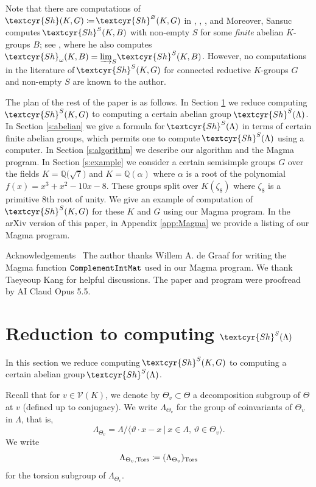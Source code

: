 \documentclass[11pt]{amsart}
\renewcommand{\mathbb}{\mathds}
\newcommand{\Sha}{{\!\textcyr{Sh}}}
\theoremstyle{plain}
\theoremstyle{definition}
\newcommand{\Q}{{\mathbb Q}}
\newcommand{\hs}{\kern 0.8pt}
\newcommand{\V}{{\mathcal V}}
\newcommand{\Tors}{{\rm Tors}}
\newcommand{\Thv}{{\Theta_v}}
\begin{document}
Note that there are computations of  $\Sha(K,G)\coloneqq\Sha^\varnothing(K,G)$
in \cite[Examples 5.6, 5.7, 5.8]{Sansuc},
\cite[\,(4.2.2)\hs]{Kottwitz-84}, \cite[Corollary 5.13]{Borovoi-Memoir},
and \cite[Theorem 9.4]{CT}
Moreover, Sansuc \cite[p.~15]{Sansuc} computes $\Sha^S(K,B)$ with non-empty $S$
for some {\em finite} abelian $K$-groups $B$;
see \cite[\S 2]{Sansuc}, where he also computes $\Sha_\omega(K,B)=\varinjlim_S \Sha^S(K,B)$.
However, no computations in the literature
of $\Sha^S(K,G)$ for connected reductive $K$-groups $G$ and non-empty $S$ are known to the author.

The plan of the rest of the paper is as follows.
In Section \ref{s:reduction} we reduce computing $\Sha^S(K,G)$
to computing a certain abelian group $\Sha^S(\Lambda)$.
In Section \ref{s:abelian} we give a formula for $\Sha^S(\Lambda)$
in terms of certain  finite abelian groups,
which permits one to compute $\Sha^S(\Lambda)$ using a computer.
In Section \ref{s:algorithm} we describe our algorithm and the Magma program.
In Section \ref{s:example} we consider a certain semisimple groups $G$
over the fields $K=\Q\big(\sqrt7\big)$ and $K=\Q(\alpha)$ where $\alpha$
is a root of the polynomial $f(x)=x^3+x^2-10x-8$.
These groups split over $K(\zeta_8)$ where $\zeta_8$ is a primitive 8th root of unity.
We give  an example of computation
of $\Sha^S(K,G)$ for these $K$ and $G$ using our Magma program.
In the arXiv version of this paper, in Appendix \ref{app:Magma}
we provide a listing of our Magma program.

{\sc Acknowledgements\ } The author thanks Willem A. de Graaf for writing the Magma function
$\tt ComplementIntMat$ used in our Magma program. We thank Taeyeoup Kang for helpful discussions.
The paper and program were proofread by AI Claud Opus 5.5.









\section{Reduction to computing $\Sha^S(\Lambda)$}
\label{s:reduction}

In this section we reduce computing $\Sha^S(K,G)$
to computing a certain abelian group $\Sha^S(\Lambda)$.

Recall that for $v\in \V(K)$, we denote by
$\Thv\subset \Theta$  a decomposition subgroup of $\Theta$ at $v$
(defined up to conjugacy).
We write $\Lambda_\Thv$ for the group of coinvariants of $\Thv$ in $\Lambda$, that is,
\[\Lambda_\Thv=\Lambda/\langle \vartheta\cdot x-x\ | \ x\in \Lambda,\, \vartheta\in\Thv\rangle.\]
We write
\[\Lambda_{\Thv,\Tors}\coloneqq (\Lambda_\Thv)_\Tors\]
for the torsion subgroup of $\Lambda_\Thv$.
\end{document}
